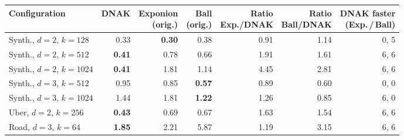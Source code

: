 \begin{tabular}{lrrrrrr}
\toprule
Configuration & DNAK & \shortstack[r]{Exponion\\ (orig.)} & \shortstack[r]{Ball\\ (orig.)} & \shortstack[r]{Ratio\\ Exp./DNAK} & \shortstack[r]{Ratio\\ Ball/DNAK} & \shortstack[r]{DNAK faster\\ (Exp.\,/\,Ball)} \\
\midrule
Synth., $d{=}2$, $k{=}128$ & 0.33 & \textbf{0.30} & 0.38 & 0.91 & 1.14 & 0, 5 \\
Synth., $d{=}2$, $k{=}512$ & \textbf{0.41} & 0.78 & 0.66 & 1.91 & 1.61 & 6, 6 \\
Synth., $d{=}2$, $k{=}1024$ & \textbf{0.41} & 1.81 & 1.14 & 4.45 & 2.81 & 6, 6 \\
Synth., $d{=}3$, $k{=}512$ & 0.95 & 0.85 & \textbf{0.57} & 0.89 & 0.60 & 0, 0 \\
Synth., $d{=}3$, $k{=}1024$ & 1.44 & 1.81 & \textbf{1.22} & 1.26 & 0.85 & 6, 0 \\
Uber, $d{=}2$, $k{=}256$ & \textbf{0.43} & 0.69 & 0.67 & 1.63 & 1.54 & 6, 6 \\
Road, $d{=}3$, $k{=}64$ & \textbf{1.85} & 2.21 & 5.87 & 1.19 & 3.15 & 6, 6 \\
\bottomrule
\end{tabular}
